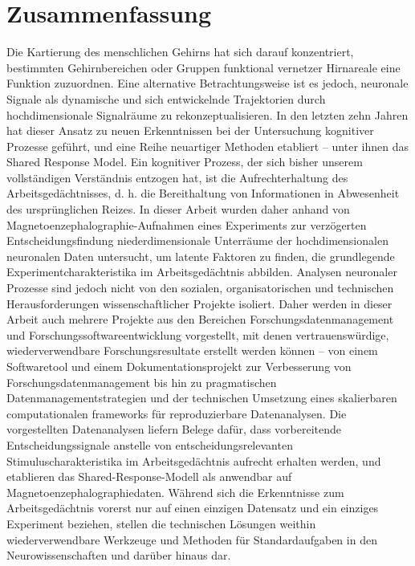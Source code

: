 \documentclass[
  a4paper,  %
  twoside,  %
  bibliography=totoc,
  headsepline,
  cleardoublepage=empty,
  parskip=half,
  draft=false
]{scrbook}
\begin{document}

\pagebreak
\section*{Zusammenfassung}

Die Kartierung des menschlichen Gehirns hat sich darauf konzentriert, bestimmten Gehirnbereichen oder Gruppen funktional vernetzer Hirnareale eine Funktion zuzuordnen.
Eine alternative Betrachtungsweise ist es jedoch, neuronale Signale als dynamische und sich entwickelnde Trajektorien durch  hochdimensionale Signalräume zu rekonzeptualisieren.
In den letzten zehn Jahren hat dieser Ansatz zu neuen Erkenntnissen bei der Untersuchung kognitiver Prozesse geführt, und
eine Reihe neuartiger Methoden etabliert -- unter ihnen das Shared Response Model.
Ein kognitiver Prozess, der sich bisher unserem vollständigen Verständnis entzogen hat, ist die Aufrechterhaltung des Arbeitsgedächtnisses, d. h. die Bereithaltung von Informationen in Abwesenheit des ursprünglichen Reizes.
In dieser Arbeit wurden daher anhand von Magnetoenzephalographie-Aufnahmen eines Experiments zur verzögerten Entscheidungsfindung  niederdimensionale Unterräume der hochdimensionalen neuronalen Daten untersucht, um latente Faktoren zu finden, die  grundlegende Experimentcharakteristika im Arbeitsgedächtnis abbilden.
Analysen neuronaler Prozesse sind jedoch nicht von den sozialen, organisatorischen und technischen Herausforderungen wissenschaftlicher Projekte isoliert.
Daher werden in dieser Arbeit auch mehrere Projekte aus den \mbox{Bereichen} Forschungsdatenmanagement und Forschungssoftwareentwicklung vorgestellt, mit denen vertrauenswürdige, wiederverwendbare Forschungsresultate erstellt werden können -- von einem Softwaretool und einem Dokumentationsprojekt zur Verbesserung von Forschungsdatenmanagement bis hin zu pragmatischen Datenmanagementstrategien und der technischen Umsetzung eines skalierbaren computationalen frameworks für  reproduzierbare Datenanalysen.
Die vorgestellten Datenanalysen liefern Belege dafür, dass vorbereitende Entscheidungssignale anstelle von entscheidungsrelevanten Stimuluscharakteristika im Arbeitsgedächtnis aufrecht erhalten werden, und etablieren das Shared-Response-Modell als anwendbar auf Magnetoenzephalographiedaten.
Während sich die Erkenntnisse zum Arbeitsgedächtnis vorerst nur auf einen einzigen Datensatz und ein einziges Experiment beziehen, stellen die technischen Lösungen weithin wiederverwendbare Werkzeuge und Methoden für Standardaufgaben in den Neurowissenschaften und darüber hinaus dar.
\end{document}
